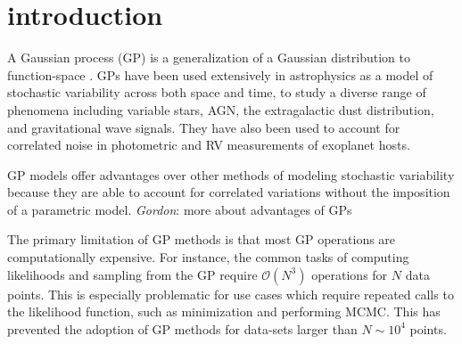 \documentclass[preprint2]{aastex62}
\newcommand{\todo}[3]{{\color{#2}\emph{#1}: #3}}
\newcommand{\gordontodo}[1]{\todo{Gordon}{red}{#1}}
\begin{document}
\section{introduction}\label{sec:intro}
    A Gaussian process (GP) is a generalization of a Gaussian distribution to 
    function-space \citep{Rasmussen2006}. GPs have been used extensively in 
    astrophysics as a model of stochastic variability across both space and time, 
    to study a diverse range of phenomena including variable stars, AGN\citep{Kelly2014}, the 
    extragalactic dust distribution\citep{Sale2018}, and gravitational wave signals\citep{Moore2016}. 
    They have also been used to account 
    for correlated noise in photometric and RV measurements of 
    exoplanet hosts\citep{Aigrain2016,Jones2017,Rajpaul2015}. 
    
    GP models offer advantages over other methods of modeling stochastic variability 
    because they are able to account for correlated variations without the imposition 
    of a parametric model. \gordontodo{more about advantages of GPs}
    
    The primary limitation of GP methods is that most GP operations are 
    computationally expensive. For instance, the common tasks 
    of computing likelihoods and sampling from the GP require 
    $\mathcal{O}(N^3)$ operations for $N$ data points. This is 
    especially problematic for use cases which require repeated calls 
    to the likelihood function, such as minimization and performing 
    MCMC. This has prevented the adoption of GP methods for data-sets 
    larger than $N\sim 10^4$ points\citep{Deisenroth2015}. 
    
\end{document}
